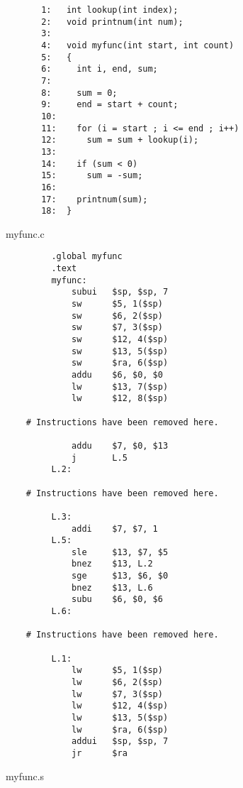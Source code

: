 \documentclass[a4paper,10pt]{article}
\begin{document}
\begin{enumerate}
\begin{figure}[ht]
{\small
\begin{verbatim}
       1:   int lookup(int index);
       2:   void printnum(int num);
       3:
       4:   void myfunc(int start, int count)
       5:   {
       6:     int i, end, sum;
       7:   
       8:     sum = 0;
       9:     end = start + count;
       10:  
       11:    for (i = start ; i <= end ; i++)
       12:      sum = sum + lookup(i);
       13:  
       14:    if (sum < 0)
       15:      sum = -sum;
       16:  
       17:    printnum(sum);
       18:  }
\end{verbatim}
} 
\caption{myfunc.c}
\label{fig:c_function}

\end{figure}

\begin{figure}[ht]
{\small
\begin{verbatim}
         .global myfunc
         .text
         myfunc:
             subui   $sp, $sp, 7
             sw      $5, 1($sp)
             sw      $6, 2($sp)
             sw      $7, 3($sp)
             sw      $12, 4($sp)
             sw      $13, 5($sp)
             sw      $ra, 6($sp)
             addu    $6, $0, $0
             lw      $13, 7($sp)
             lw      $12, 8($sp)

    # Instructions have been removed here.

             addu    $7, $0, $13
             j       L.5
         L.2:

    # Instructions have been removed here.

         L.3:
             addi    $7, $7, 1
         L.5:
             sle     $13, $7, $5
             bnez    $13, L.2
             sge     $13, $6, $0
             bnez    $13, L.6
             subu    $6, $0, $6
         L.6:

    # Instructions have been removed here.

         L.1:
             lw      $5, 1($sp)
             lw      $6, 2($sp)
             lw      $7, 3($sp)
             lw      $12, 4($sp)
             lw      $13, 5($sp)
             lw      $ra, 6($sp)
             addui   $sp, $sp, 7
             jr      $ra
\end{verbatim}
} 
\caption{myfunc.s}
\label{fig:c_function_wramp_code}

\end{figure}


\end{enumerate}
\end{document}
